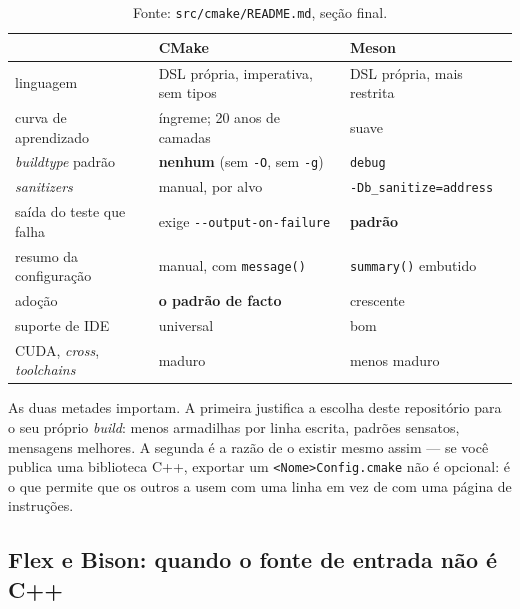 \begin{table}[htbp]
\centering
\caption{Fonte: \texttt{src/cmake/README.md}, seção final.}
\label{tab:cmake-vs-meson}
\footnotesize
\begin{tabular}{@{}p{}p{}p{}@{}}
\toprule
 & \textbf{CMake} & \textbf{Meson} \\
\midrule
linguagem                & DSL própria, imperativa, sem tipos & DSL própria, mais restrita \\
curva de aprendizado     & íngreme; 20 anos de camadas & suave \\
\emph{buildtype} padrão  & \textbf{nenhum} (sem \texttt{-O}, sem \texttt{-g}) & \texttt{debug} \\
\emph{sanitizers}        & manual, por alvo & \texttt{-Db\_sanitize=address} \\
saída do teste que falha & exige \texttt{-{}-output-on-failure} & \textbf{padrão} \\
resumo da configuração   & manual, com \texttt{message()} & \texttt{summary()} embutido \\
adoção                   & \textbf{o padrão de facto} & crescente \\
suporte de IDE           & universal & bom \\
CUDA, \emph{cross}, \emph{toolchains} & maduro & menos maduro \\
\bottomrule
\end{tabular}
\end{table}

\begin{regra}
As duas metades importam. A primeira justifica a escolha deste repositório para
o seu próprio \emph{build}: menos armadilhas por linha escrita, padrões
sensatos, mensagens melhores. A segunda é a razão de o  existir
mesmo assim --- se você publica uma biblioteca C++, exportar um
\texttt{<Nome>Config.cmake} não é opcional: é o que permite que os outros a
usem com uma linha em vez de com uma página de instruções.
\end{regra}

\subsection{Flex e Bison: quando o fonte de entrada não é C++}
\label{sec:parser-build}


